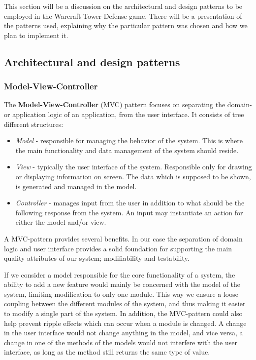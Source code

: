 This section will be a discussion on the architectural and design patterns to be employed in the Warcraft Tower Defense game. There will be a presentation of the patterns used, explaining why the particular pattern was chosen and how we plan to implement it.

\subsection{Architectural and design patterns}
\subsubsection{Model-View-Controller}
The \textbf{Model-View-Controller} (MVC) pattern focuses on separating the domain- or application logic of an application, from the user interface. It consists of tree different structures\cite{wiki:mvc}:
\begin{itemize}
\item \emph{Model} - responsible for managing the behavior of the system. This is where the main functionality and data management of the system should reside.
\item \emph{View} - typically the user interface of the system. Responsible only for drawing or displaying information on screen. The data which is supposed to be shown, is generated and managed in the model.
\item \emph{Controller} - manages input from the user in addition to what should be the following response from the system. An input may instantiate an action for either the model and/or view. 
\end{itemize}
 
A MVC-pattern provides several benefits. In our case the separation of domain logic and user interface provides a solid foundation for supporting the main quality attributes of our system; modifiability and testability. 

If we consider a model responsible for the core functionality of a system, the ability to add a new feature would mainly be concerned with the model of the system, limiting modification to only one module. This way we ensure a loose coupling between the different modules of the system, and thus making it easier to modify a single part of the system. In addition, the MVC-pattern could also help prevent ripple effects which can occur when a module is changed. A change in the user interface would not change anything in the model, and vice versa, a change in one of the methods of the models would not interfere with the user interface, as long as the method still returns the same type of value. 


